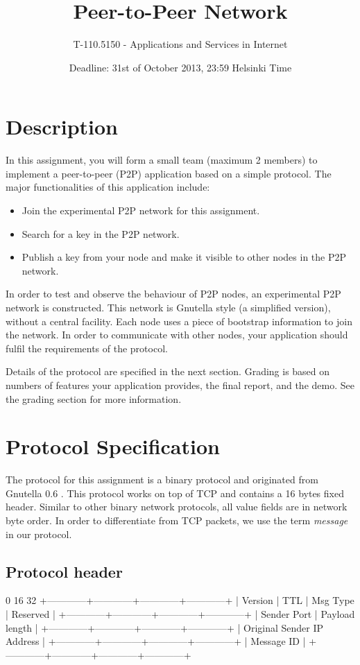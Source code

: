 \documentclass[12pt, a4paper]{article}
\title{Peer-to-Peer Network}
\author{T-110.5150 - Applications and Services in Internet}
\date{Deadline: 31st of October 2013, 23:59 Helsinki Time}
\begin{document}
\maketitle
\section{Description}
In this assignment, you will form a small team (maximum 2 members) to implement a peer-to-peer (P2P) application based on a simple protocol.
The major functionalities of this application include:

\begin{itemize}
\item Join the experimental P2P network for this assignment.
\item Search for a key in the P2P network.
\item Publish a key from your node and make it visible to other nodes in the P2P network.
\end{itemize}

In order to test and observe the behaviour of P2P nodes, an experimental P2P network is constructed.
This network is Gnutella style (a simplified version), without a central facility.
Each node uses a piece of bootstrap information to join the network.
In order to communicate with other nodes, your application should fulfil the requirements of the protocol.

Details of the protocol are specified in the next section.
Grading is based on numbers of features your application provides, the final report, and the demo.
See the grading section for more information.


\section{Protocol Specification}
The protocol for this assignment is a binary protocol and originated from Gnutella 0.6 \cite{gnutella}.
This protocol works on top of TCP and contains a 16 bytes fixed header.
Similar to other binary network protocols, all value fields are in network byte order.
In order to differentiate from TCP packets, we use the term \emph{message} in our protocol.

\subsection{Protocol header}
\begin{verbbox}
0                          16                        32
+------------+------------+------------+------------+
|  Version   |     TTL    | Msg Type   |  Reserved  |
+------------+------------+------------+------------+
|       Sender Port       |       Payload length    |
+------------+------------+------------+------------+
|            Original Sender IP Address             |
+------------+------------+------------+------------+
|                     Message ID                    |
+------------+------------+------------+------------+
\end{verbbox}
\end{document}
